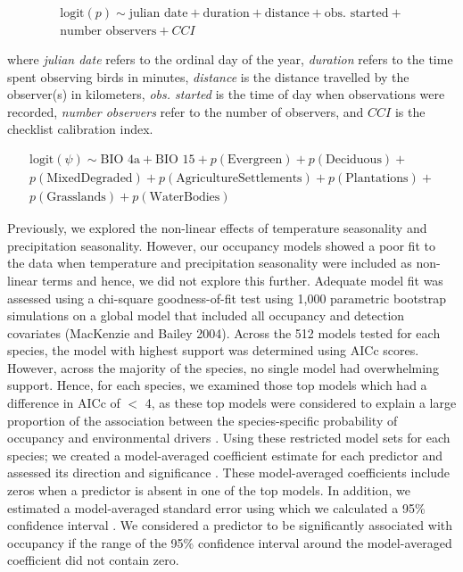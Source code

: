 \begin{multline*}
    \text{logit}(p) \sim \text{julian date} + \text{duration} + \text{distance} + \text{obs. started} + \\
    \text{number observers} + CCI    
\end{multline*}

where \textit{julian date} refers to the ordinal day of the year, \textit{duration} refers to the time spent observing birds in minutes, \textit{distance} is the distance travelled by the observer(s) in kilometers, \textit{obs. started} is the time of day when observations were recorded, \textit{number observers} refer to the number of observers, and $CCI$ is the checklist calibration index.

\begin{multline*}
    \text{logit}(\psi) \sim \text{BIO 4a} + \text{BIO 15} + p(\text{Evergreen}) + p(\text{Deciduous}) + \\
    p(\text{MixedDegraded}) + p(\text{AgricultureSettlements}) + p(\text{Plantations}) + \\
    p(\text{Grasslands}) + p(\text{WaterBodies})
\end{multline*}

Previously, we explored the non-linear effects of temperature seasonality and precipitation seasonality.
However, our occupancy models showed a poor fit to the data when temperature and precipitation seasonality were included as non-linear terms and hence, we did not explore this further.
Adequate model fit was assessed using a chi-square goodness-of-fit test using 1,000 parametric bootstrap simulations on a global model that included all occupancy and detection covariates (MacKenzie and Bailey 2004).
Across the 512 models tested for each species, the model with highest support was determined using AICc scores.
However, across the majority of the species, no single model had overwhelming support.
Hence, for each species, we examined those top models which had a difference in AICc of $<$ 4, as these top models were considered to explain a large proportion of the association between the species-specific probability of occupancy and environmental drivers \citep{burnham2011}.
Using these restricted model sets for each species; we created a model-averaged coefficient estimate for each predictor and assessed its direction and significance \citep{barton2009}.
These model-averaged coefficients include zeros when a predictor is absent in one of the top models.
In addition, we estimated a model-averaged standard error using which we calculated a 95\% confidence interval \citep{burnham2002}.
We considered a predictor to be significantly associated with occupancy if the range of the 95\% confidence interval around the model-averaged coefficient did not contain zero.

